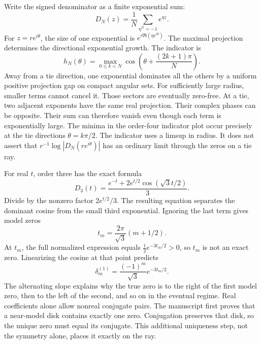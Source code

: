 Write the signed denominator as a finite exponential sum:
\[
D_N(z)=\frac1N\sum_{\eta^N=-1}e^{\eta z}.
\]
For $z=re^{i\theta}$, the size of one exponential is $e^{r\Re(\eta e^{i\theta})}$. The maximal projection determines the directional exponential growth.
The indicator is
\[
h_N(\theta)=\max_{0\le k<N}\cos\left(\theta+\frac{(2k+1)\pi}{N}\right).
\]
Away from a tie direction, one exponential dominates all the others by a uniform positive projection gap on compact angular sets. For sufficiently large radius, smaller terms cannot cancel it. Those sectors are eventually zero-free.
At a tie, two adjacent exponents have the same real projection. Their complex phases can be opposite. Their sum can therefore vanish even though each term is exponentially large. The minima in the order-four indicator plot occur precisely at the tie directions $\theta=k\pi/2$.
The indicator uses a limsup in radius. It does not assert that $r^{-1}\log|D_N(re^{i\theta})|$ has an ordinary limit through the zeros on a tie ray.

For real $t$, order three has the exact formula
\[
D_3(t)=\frac{e^{-t}+2e^{t/2}\cos(\sqrt3t/2)}{3}.
\]
Divide by the nonzero factor $2e^{t/2}/3$. The resulting equation separates the dominant cosine from the small third exponential.
Ignoring the last term gives model zeros
\[
t_m=\frac{2\pi}{\sqrt3}(m+1/2).
\]
At $t_m$, the full normalized expression equals $\tfrac12e^{-3t_m/2}>0$, so $t_m$ is not an exact zero. Linearizing the cosine at that point predicts
\[
\delta_m^{(1)}=\frac{(-1)^m}{\sqrt3}e^{-3t_m/2}.
\]
The alternating slope explains why the true zero is to the right of the first model zero, then to the left of the second, and so on in the eventual regime.
Real coefficients alone allow nonreal conjugate pairs. The manuscript first proves that a near-model disk contains exactly one zero. Conjugation preserves that disk, so the unique zero must equal its conjugate. This additional uniqueness step, not the symmetry alone, places it exactly on the ray.


